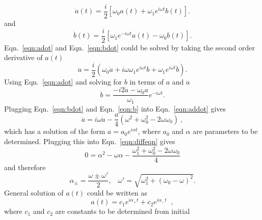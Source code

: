 \begin{equation}
\label{eqn:adot}
\dot{a}(t) = \frac{i}{2}[\omega_{0}a(t)+\omega_{1}e^{i\omega t}b(t)].
\end{equation}
%
and
%
\begin{equation}
\label{eqn:bdot}
\dot{b}(t) = \frac{i}{2}[\omega_{1}e^{-i\omega t}a(t)-\omega_{0}b(t)].
\end{equation}
%
Eqn.~\ref{eqn:adot} and Eqn.~\ref{eqn:bdot} could be solved by taking
the second order derivative of $a(t)$
%
\begin{equation}
\label{eqn:addot}
\ddot{a} = \frac{i}{2}(\omega_{0}\dot{a}+i\omega \omega_{1} e^{i\omega t} b + \omega_{1}e^{i\omega t} \dot{b})  .
\end{equation}
%
Using Eqn.~\ref{eqn:adot} and solving for $b$ in terms of $a$
and $\dot{a}$
%
\begin{equation}
\label{eqn:b}
b = \frac{-i 2 \dot{a} - \omega_{0} a}{\omega_{1}}e^{-i\omega t} .
\end{equation}
%
Plugging Eqn.~\ref{eqn:bdot} and Eqn.~\ref{eqn:b} into
Eqn.~\ref{eqn:addot} gives
%
\begin{equation}
\label{eqn:diffeqn}
\ddot{a} = i\omega \dot{a} - \frac{a}{4} (\omega^{2} + \omega_{0}^{2} - 2\omega\omega_{0}) ~ ,
\end{equation}
%
which has a solution of the form $a = a_{0}e^{i\alpha t}$, where
$a_{0}$ and $\alpha$ are parameters to be determined.  Plugging this
into Eqn.~\ref{eqn:diffeqn} gives
%
\begin{equation}
0 = \alpha^{2} - \omega \alpha - \frac{\omega_{1}^{2} + \omega_{0}^{2} - 2\omega \omega_{0}}{4} 
\end{equation}
%
and therefore
%
\begin{equation}
\alpha_{\pm} = \frac{\omega \pm \omega'}{2} , \;\;\;  \omega' = \sqrt{\omega_{1}^{2} + (\omega_{0}-\omega)^{2}}  .
\end{equation}
%
General solution of $a(t)$ could be written as
%
\begin{equation}
\label{eqn:gena}
a(t)=c_{1}e^{i\alpha_{+}t} + c_{2}e^{i\alpha_{-}t} \;\; ,
\end{equation}
%
where $c_{1}$ and $c_{2}$ are constants to be determined from initial
